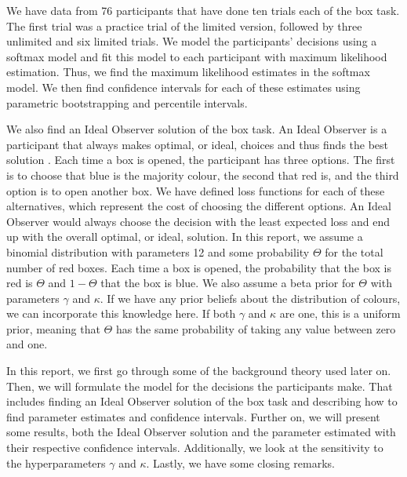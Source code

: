 We have data from 76 participants that have done ten trials each of the box task. The first trial was a practice trial of the limited version, followed by three unlimited and six limited trials. We model the participants' decisions using a softmax model and fit this model to each participant with maximum likelihood estimation. Thus, we find the maximum likelihood estimates in the softmax model. We then find confidence intervals for each of these estimates using parametric bootstrapping and percentile intervals.

We also find an Ideal Observer solution of the box task. An Ideal Observer is a participant that always makes optimal, or ideal, choices and thus finds the best solution \citep{idealObs}. Each time a box is opened, the participant has three options. The first is to choose that blue is the majority colour, the second that red is, and the third option is to open another box. We have defined loss functions for each of these alternatives, which represent the cost of choosing the different options. An Ideal Observer would always choose the decision with the least expected loss and end up with the overall optimal, or ideal, solution. In this report, we assume a binomial distribution with parameters 12 and some probability $\Theta$ for the total number of red boxes. Each time a box is opened, the probability that the box is red is $\Theta$ and $1-\Theta$ that the box is blue. We also assume a beta prior for $\Theta$ with parameters $\gamma$ and $\kappa$. If we have any prior beliefs about the distribution of colours, we can incorporate this knowledge here. If both $\gamma$ and $\kappa$ are one, this is a uniform prior, meaning that $\Theta$ has the same probability of taking any value between zero and one. 





In this report, we first go through some of the background theory used later on. Then, we will formulate the model for the decisions the participants make. That includes finding an Ideal Observer solution of the box task and describing how to find parameter estimates and confidence intervals. Further on, we will present some results, both the Ideal Observer solution and the parameter estimated with their respective confidence intervals. Additionally, we look at the sensitivity to the hyperparameters $\gamma$ and $\kappa$. Lastly, we have some closing remarks. 